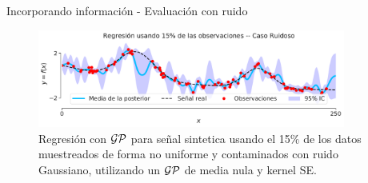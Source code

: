 \documentclass[handout, 9pt]{beamer}
\begin{document}
 \begin{frame}{Incorporando información - Evaluación con ruido}
 \begin{figure}[H]
  \centering
  \includegraphics[width=0.9\textwidth]{../img/cap8_posterior_ruido}
  \caption{Regresión con $\mathcal{GP}$ para señal sintetica usando el 15$\%$ de los datos muestreados de forma no uniforme y contaminados con ruido Gaussiano, utilizando un $\mathcal{GP}$ de media nula y kernel SE.}
  \label{fig:gp_3}
\end{figure}

 \end{frame}



\begin{frame}
  \titlepage
\end{frame}




%
\end{document}
